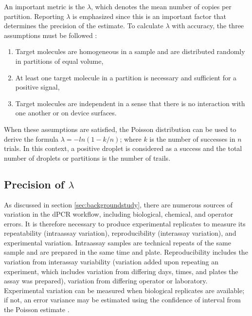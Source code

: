An important metric is the \(\lambda\), which denotes the mean number of copies per partition. Reporting \(\lambda\) is emphasized since this is an important factor that determines the precision of the estimate. To calculate \(\lambda\) with accuracy, the three assumptions must be followed \cite{Kreutz2011}:
\begin{enumerate}
    \item Target molecules are homogeneous in a sample and are distributed randomly in partitions of equal volume,
    \item At least one target molecule in a partition is necessary and sufficient for a positive signal,
    \item Target molecules are independent in a sense that there is no interaction with one another or on device surfaces.
\end{enumerate}

When these assumptions are satisfied, the Poisson distribution can be used to derive the formula \(\lambda = -ln(1-k/n)\); where \(k\) is the number of successes in \(n\) trials. In this context, a positive droplet is considered as a success and the total number of droplets or partitions is the number of trails.

\subsection{Precision of \(\lambda\)}
\label{sec:ch2_perfeval_essentialMetrics}
As discussed in section \ref{sec:backgroundstudy}, there are numerous sources of variation in the dPCR workflow, including biological, chemical, and operator errors. It is therefore necessary to produce experimental replicates to measure its repeatability (intraassay variation), reproducibility (interassay variation), and experimental variation. Intraassay samples are technical repeats of the same sample and are prepared in the same time and plate. Reproducibility includes the variation from interassay variability (variation added upon repeating an experiment, which includes variation from differing days, times, and plates the assay was prepared), variation from differing operator or laboratory. Experimental variation can be measured when biological replicates are available; if not, an error variance may be estimated using the confidence of interval from the Poisson estimate \cite{Huggett2013_MIQEGuidelines}.

